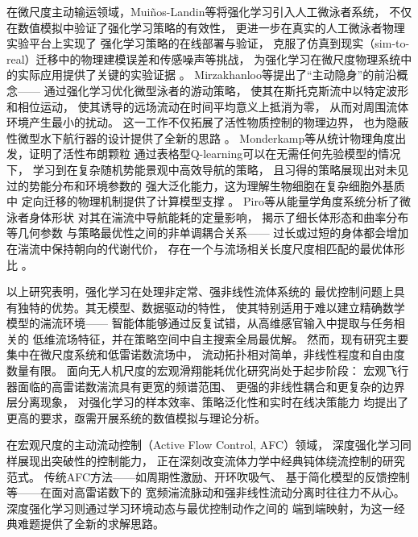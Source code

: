 在微尺度主动输运领域，Muiños-Landin等将强化学习引入人工微泳者系统，
不仅在数值模拟中验证了强化学习策略的有效性，
更进一步在真实的人工微泳者物理实验平台上实现了
强化学习策略的在线部署与验证，
克服了仿真到现实（sim-to-real）迁移中的物理建模误差和传感噪声等挑战，
为强化学习在微尺度物理系统中的实际应用提供了关键的实验证据
\cite{muinos-landinReinforcementLearningArtificial2021}。
Mirzakhanloo等提出了“主动隐身”的前沿概念——
通过强化学习优化微型泳者的游动策略，
使其在斯托克斯流中以特定波形和相位运动，
使其诱导的远场流动在时间平均意义上抵消为零，
从而对周围流体环境产生最小的扰动。
这一工作不仅拓展了活性物质控制的物理边界，
也为隐蔽性微型水下航行器的设计提供了全新的思路
\cite{mirzakhanlooActiveCloakingStokes2020}。
Monderkamp等从统计物理角度出发，证明了活性布朗颗粒
通过表格型Q-learning可以在无需任何先验模型的情况下，
学习到在复杂随机势能景观中高效导航的策略，
且习得的策略展现出对未见过的势能分布和环境参数的
强大泛化能力，这为理解生物细胞在复杂细胞外基质中
定向迁移的物理机制提供了计算模型支撑
\cite{monderkampActiveParticlesUsing2022}。
Piro等从能量学角度系统分析了微泳者身体形状
对其在湍流中导航能耗的定量影响，
揭示了细长体形态和曲率分布等几何参数
与策略最优性之间的非单调耦合关系——
过长或过短的身体都会增加在湍流中保持朝向的代谢代价，
存在一个与流场相关长度尺度相匹配的最优体形比
\cite{piroEnergeticCostMicroswimmer2024}。

以上研究表明，强化学习在处理非定常、强非线性流体系统的
最优控制问题上具有独特的优势。其无模型、数据驱动的特性，
使其特别适用于难以建立精确数学模型的湍流环境——
智能体能够通过反复试错，从高维感官输入中提取与任务相关的
低维流场特征，并在策略空间中自主搜索全局最优解。
然而，现有研究主要集中在微尺度系统和低雷诺数流场中，
流动拓扑相对简单，非线性程度和自由度数量有限。
面向无人机尺度的宏观滑翔能耗优化研究尚处于起步阶段：
宏观飞行器面临的高雷诺数湍流具有更宽的频谱范围、
更强的非线性耦合和更复杂的边界层分离现象，
对强化学习的样本效率、策略泛化性和实时在线决策能力
均提出了更高的要求，亟需开展系统的数值模拟与理论分析。

在宏观尺度的主动流动控制（Active Flow Control, AFC）领域，
深度强化学习同样展现出突破性的控制能力，
正在深刻改变流体力学中经典钝体绕流控制的研究范式。
传统AFC方法——如周期性激励、开环吹吸气、
基于简化模型的反馈控制等——在面对高雷诺数下的
宽频湍流脉动和强非线性流动分离时往往力不从心。
深度强化学习则通过学习环境动态与最优控制动作之间的
端到端映射，为这一经典难题提供了全新的求解思路。

